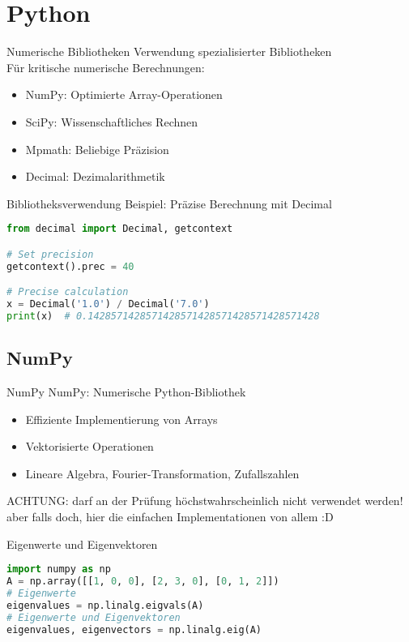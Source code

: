 
\section{Python}

\begin{remark2}{Numerische Bibliotheken} Verwendung spezialisierter Bibliotheken\\
Für kritische numerische Berechnungen:
\begin{itemize}
    \item NumPy: Optimierte Array-Operationen
    \item SciPy: Wissenschaftliches Rechnen
    \item Mpmath: Beliebige Präzision
    \item Decimal: Dezimalarithmetik
\end{itemize}
\end{remark2}

\begin{example2}{Bibliotheksverwendung} Beispiel: Präzise Berechnung mit Decimal
\begin{lstlisting}[language=Python, style=basesmol]
from decimal import Decimal, getcontext

# Set precision
getcontext().prec = 40

# Precise calculation
x = Decimal('1.0') / Decimal('7.0')
print(x)  # 0.1428571428571428571428571428571428571428
\end{lstlisting}
\end{example2}

\subsection{NumPy}

\begin{remark2}{NumPy} NumPy: Numerische Python-Bibliothek
\begin{itemize}
    \item Effiziente Implementierung von Arrays
    \item Vektorisierte Operationen
    \item Lineare Algebra, Fourier-Transformation, Zufallszahlen
\end{itemize} 
ACHTUNG: darf an der Prüfung höchstwahrscheinlich nicht verwendet werden!
aber falls doch, hier die einfachen Implementationen von allem :D
\end{remark2}

\begin{examplecode}{Eigenwerte und Eigenvektoren}
\begin{lstlisting}[language=Python, style=basesmol]
import numpy as np
A = np.array([[1, 0, 0], [2, 3, 0], [0, 1, 2]])
# Eigenwerte
eigenvalues = np.linalg.eigvals(A)
# Eigenwerte und Eigenvektoren
eigenvalues, eigenvectors = np.linalg.eig(A)
\end{lstlisting}
\end{examplecode}

